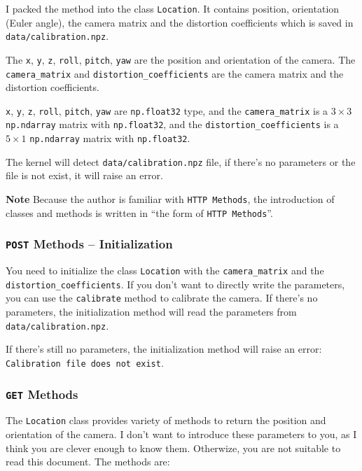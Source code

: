 \documentclass{article}
\begin{document}
I packed the method into the class \texttt{Location}. It contains position, orientation (Euler angle), the camera matrix and the distortion coefficients which is saved in \texttt{data/calibration.npz}.

The \texttt{x}, \texttt{y}, \texttt{z}, \texttt{roll}, \texttt{pitch}, \texttt{yaw} are the position and orientation of the camera. The \texttt{camera\_matrix} and \texttt{distortion\_coefficients} are the camera matrix and the distortion coefficients.

\texttt{x}, \texttt{y}, \texttt{z}, \texttt{roll}, \texttt{pitch}, \texttt{yaw} are \texttt{np.float32} type, and the \texttt{camera\_matrix} is a $3\times3$ \texttt{np.ndarray} matrix with \texttt{np.float32}, and the \texttt{distortion\_coefficients} is a $5\times1$ \texttt{np.ndarray} matrix with \texttt{np.float32}.

The kernel will detect \texttt{data/calibration.npz} file, if there's no parameters or the file is not exist, it will raise an error.

\textbf{Note} Because the author is familiar with \texttt{HTTP Methods}, the introduction of classes and methods is written in ``the form of \texttt{HTTP Methods}''.

\subsubsection{\texttt{POST} Methods -- Initialization}

You need to initialize the class \texttt{Location} with the \texttt{camera\_matrix} and the \texttt{distortion\_coefficients}. If you don't want to directly write the parameters, you can use the \texttt{calibrate} method to calibrate the camera. If there's no parameters, the initialization method will read the parameters from \texttt{data/calibration.npz}.

If there's still no parameters, the initialization method will raise an error: \texttt{Calibration file does not exist}.


\subsubsection{\texttt{GET} Methods}

The \texttt{Location} class provides variety of methods to return the position and orientation of the camera. I don't want to introduce these parameters to you, as I think you are clever enough to know them. Otherwize, you are not suitable to read this document. The methods are:
\end{document}
